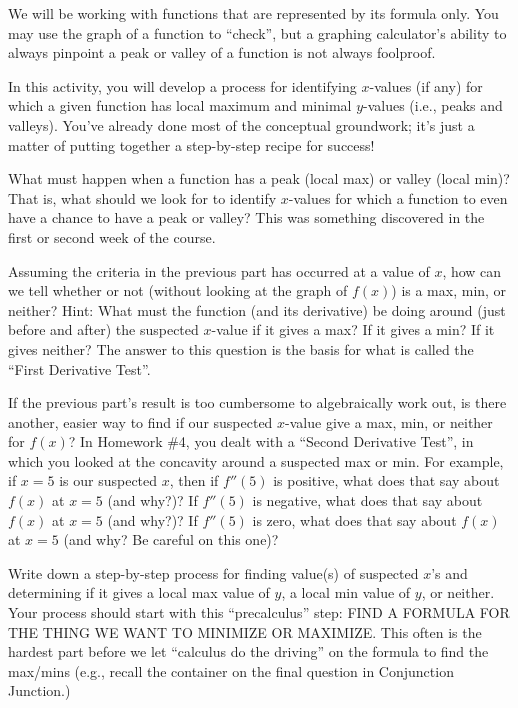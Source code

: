 \documentclass{ximera}
\begin{document}
We will be working with functions that are represented by its formula only.  You may use the graph of a function to ``check'', but a graphing calculator's ability to always pinpoint a peak or valley of a function is not always foolproof.

In this activity, you will develop a process for identifying $x$-values (if any) for which a given function has local maximum and minimal $y$-values (i.e., peaks and valleys).  You've already done most of the conceptual groundwork; it's just a matter of putting together a step-by-step recipe for success!

\begin{exploration} 
What must happen when a function  has a peak (local max) or valley (local min)?  That is, what should we look for to identify $x$-values for which a function to even have a chance to have a peak or valley?  This was something discovered in the first or second week of the course.
\end{exploration}
\begin{exploration}
Assuming the criteria in the previous part has occurred at a value of $x$, how can we tell whether or not (without looking at the graph of  $f(x)$) is a max, min, or neither?  Hint:  What must the function (and its derivative) be doing around (just before and after) the suspected $x$-value if it gives a max?  If it gives a min?  If it gives neither?  The answer to this question is the basis for what is called the ``First Derivative Test''. 
\end{exploration}	
\begin{exploration} 
If the previous part's result is too cumbersome to algebraically work out, is there another, easier way to find if our suspected $x$-value give a max, min, or neither for $f(x)$?  In Homework \#4, you dealt with a ``Second Derivative Test'', in which you looked at the concavity around a suspected max or min.  For example, if $x = 5$ is our suspected $x$, then if $f''(5)$ is positive, what does that say about $f(x)$ at $x = 5$ (and why?)?  If $f''(5)$ is negative, what does that say about $f(x)$ at $x = 5$ (and why?)?  If $f''(5)$ is zero, what does that say about $f(x)$ at $x = 5$ (and why? Be careful on this one)?  
\end{exploration}
\begin{exploration} 
Write down a step-by-step process for finding value(s) of suspected $x$'s and determining if it gives a local max value of $y$, a local min value of $y$, or neither.  Your process should start with this ``precalculus'' step:  FIND A FORMULA FOR THE THING WE WANT TO MINIMIZE OR MAXIMIZE.  This often is the hardest part before we let ``calculus do the driving'' on the formula to find the max/mins (e.g., recall the container on the final question in Conjunction Junction.)
\end{exploration}
\end{document}
